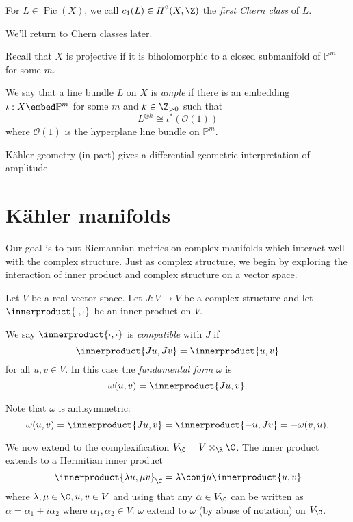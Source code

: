 \documentclass[a4paper]{article}
\renewcommand{\P}{\mathbb P} %
\DeclareMathOperator{\Pic}{Pic} %
\newcommand*{\ip}{\innerproduct}
\begin{document}
\begin{definition}
  For \(L \in \Pic(X)\), we call \(c_1(L) \in H^2(X, \Z)\) the \emph{first Chern class} of \(L\).
\end{definition}
We'll return to Chern classes later.

Recall that \(X\) is projective if it is biholomorphic to a closed submanifold of \(\P^m\) for some \(m\).

\begin{definition}
  We say that a line bundle \(L\) on \(X\) is \emph{ample} if there is an embedding \(\iota: X \embed \P^m\) for some \(m\) and \(k \in \Z_{> 0}\) such that
  \[
    L^{\otimes k} \cong \iota^*(\mathcal O(1))
  \]
  where \(\mathcal O(1)\) is the hyperplane line bundle on \(\P^m\).
\end{definition}

Kähler geometry (in part) gives a differential geometric interpretation of amplitude.

\section{Kähler manifolds}

Our goal is to put Riemannian metrics on complex manifolds which interact well with the complex structure. Just as complex structure, we begin by exploring the interaction of inner product and complex structure on a vector space.

Let \(V\) be a real vector space. Let \(J: V \to V\) be a complex structure and let \(\ip{\cdot, \cdot}\) be an inner product on \(V\).

\begin{definition}
  We say \(\ip{\cdot, \cdot}\) is  \emph{compatible} with \(J\) if
  \[
    \ip{Ju, Jv} = \ip{u, v}
  \]
  for all \(u, v \in V\). In this case the \emph{fundamental form} \(\omega\) is
  \[
    \omega(u, v) = \ip{Ju, v}.
  \]
\end{definition}
Note that \(\omega\) is antisymmetric:
\[
  \omega(u, v) = \ip{Ju, v} = \ip{-u, Jv} = - \omega(v, u).
\]

We now extend to the complexification \(V_\C = V \otimes_\R \C\). The inner product extends to a Hermitian inner product
\[
  \ip{\lambda u, \mu v}_\C = \lambda \conj \mu \ip{u, v}
\]
where \(\lambda, \mu \in \C, u, v \in V\) and using that any \(\alpha \in V_\C\) can be written as \(\alpha = \alpha_1 + i\alpha_2\) where \(\alpha_1, \alpha_2 \in V\). \(\omega\) extend to \(\omega\) (by abuse of notation) on \(V_\C\).
\end{document}
